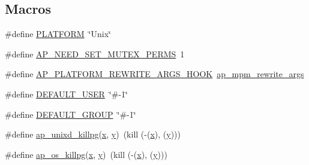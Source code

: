 \subsection*{Macros}
\begin{DoxyCompactItemize}
\item 
\#define \hyperlink{group__APACHE__OS__UNIX_ga1fa4f1561216be34f745f32aaa38d943}{P\+L\+A\+T\+F\+O\+RM}~\char`\"{}Unix\char`\"{}
\item 
\#define \hyperlink{group__APACHE__OS__UNIX_ga1b7c94e72253b77a3a38360bbb81b6b2}{A\+P\+\_\+\+N\+E\+E\+D\+\_\+\+S\+E\+T\+\_\+\+M\+U\+T\+E\+X\+\_\+\+P\+E\+R\+MS}~1
\item 
\#define \hyperlink{group__APACHE__OS__UNIX_gafadf468b66524ea08fc3536aead78644}{A\+P\+\_\+\+P\+L\+A\+T\+F\+O\+R\+M\+\_\+\+R\+E\+W\+R\+I\+T\+E\+\_\+\+A\+R\+G\+S\+\_\+\+H\+O\+OK}~\hyperlink{group__APACHE__MPM_ga2d02d210669b87ebd911109155b51a1c}{ap\+\_\+mpm\+\_\+rewrite\+\_\+args}
\item 
\#define \hyperlink{group__APACHE__OS__UNIX_ga69835b041523b72b6c9ffad26229abbd}{D\+E\+F\+A\+U\+L\+T\+\_\+\+U\+S\+ER}~\char`\"{}\#-\/1\char`\"{}
\item 
\#define \hyperlink{group__APACHE__OS__UNIX_ga45b6308e1477048e29afac209cfe9ec1}{D\+E\+F\+A\+U\+L\+T\+\_\+\+G\+R\+O\+UP}~\char`\"{}\#-\/1\char`\"{}
\item 
\#define \hyperlink{group__APACHE__OS__UNIX_gaec1dc6d10853dc3fed29c105fba9e74a}{ap\+\_\+unixd\+\_\+killpg}(\hyperlink{pcregrep_8txt_a4242e9148f20c002763bf4ba53b26ad6}{x},  \hyperlink{group__MOD__CACHE_gad4d47f76a849e2c428e3dd7f8c4eab1f}{y})~(kill (-\/(\hyperlink{pcregrep_8txt_a4242e9148f20c002763bf4ba53b26ad6}{x}), (\hyperlink{group__MOD__CACHE_gad4d47f76a849e2c428e3dd7f8c4eab1f}{y})))
\item 
\#define \hyperlink{group__APACHE__OS__UNIX_ga9cbd69c682f399fc82ab29d2c92cb7ff}{ap\+\_\+os\+\_\+killpg}(\hyperlink{pcregrep_8txt_a4242e9148f20c002763bf4ba53b26ad6}{x},  \hyperlink{group__MOD__CACHE_gad4d47f76a849e2c428e3dd7f8c4eab1f}{y})~(kill (-\/(\hyperlink{pcregrep_8txt_a4242e9148f20c002763bf4ba53b26ad6}{x}), (\hyperlink{group__MOD__CACHE_gad4d47f76a849e2c428e3dd7f8c4eab1f}{y})))
\end{DoxyCompactItemize}
